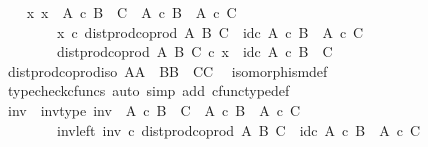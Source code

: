 \begin{isabellebody}
\ \ \isamarkupfalse%
\ {\isachardoublequoteopen}{\isasymexists}x{\isachardot}{\kern0pt}\ x\ {\isacharcolon}{\kern0pt}\ A\ {\isasymtimes}\isactrlsub c\ B\ {\isasymCoprod}\ C\ {\isasymrightarrow}\ {\isacharparenleft}{\kern0pt}A\ {\isasymtimes}\isactrlsub c\ B{\isacharparenright}{\kern0pt}\ {\isasymCoprod}\ A\ {\isasymtimes}\isactrlsub c\ C\ {\isasymand}\isanewline
\ \ \ \ \ \ \ \ x\ {\isasymcirc}\isactrlsub c\ dist{\isacharunderscore}{\kern0pt}prod{\isacharunderscore}{\kern0pt}coprod\ A\ B\ C\ {\isacharequal}{\kern0pt}\ id\isactrlsub c\ {\isacharparenleft}{\kern0pt}{\isacharparenleft}{\kern0pt}A\ {\isasymtimes}\isactrlsub c\ B{\isacharparenright}{\kern0pt}\ {\isasymCoprod}\ A\ {\isasymtimes}\isactrlsub c\ C{\isacharparenright}{\kern0pt}\ {\isasymand}\isanewline
\ \ \ \ \ \ \ \ dist{\isacharunderscore}{\kern0pt}prod{\isacharunderscore}{\kern0pt}coprod\ A\ B\ C\ {\isasymcirc}\isactrlsub c\ x\ {\isacharequal}{\kern0pt}\ id\isactrlsub c\ {\isacharparenleft}{\kern0pt}A\ {\isasymtimes}\isactrlsub c\ B\ {\isasymCoprod}\ C{\isacharparenright}{\kern0pt}{\isachardoublequoteclose}\isanewline
\ \ \ \ \isamarkupfalse%
\ dist{\isacharunderscore}{\kern0pt}prod{\isacharunderscore}{\kern0pt}coprod{\isacharunderscore}{\kern0pt}iso{\isacharbrackleft}{\kern0pt}\ A{\isacharequal}{\kern0pt}A{\isacharcomma}{\kern0pt}\ \ B{\isacharequal}{\kern0pt}B{\isacharcomma}{\kern0pt}\ \ C{\isacharequal}{\kern0pt}C{\isacharbrackright}{\kern0pt}\ \isamarkupfalse%
\ isomorphism{\isacharunderscore}{\kern0pt}def\isanewline
\ \ \ \ \isamarkupfalse%
\ {\isacharparenleft}{\kern0pt}typecheck{\isacharunderscore}{\kern0pt}cfuncs{\isacharcomma}{\kern0pt}\ auto\ simp\ add{\isacharcolon}{\kern0pt}\ cfunc{\isacharunderscore}{\kern0pt}type{\isacharunderscore}{\kern0pt}def{\isacharparenright}{\kern0pt}\isanewline
\ \ \isamarkupfalse%
\ \isamarkupfalse%
\ inv\ \ inv{\isacharunderscore}{\kern0pt}type{\isacharcolon}{\kern0pt}\ {\isachardoublequoteopen}inv\ {\isacharcolon}{\kern0pt}\ A\ {\isasymtimes}\isactrlsub c\ B\ {\isasymCoprod}\ C\ {\isasymrightarrow}\ {\isacharparenleft}{\kern0pt}A\ {\isasymtimes}\isactrlsub c\ B{\isacharparenright}{\kern0pt}\ {\isasymCoprod}\ A\ {\isasymtimes}\isactrlsub c\ C{\isachardoublequoteclose}\ \isanewline
\ \ \ \ \ \ \ \ inv{\isacharunderscore}{\kern0pt}left{\isacharcolon}{\kern0pt}\ {\isachardoublequoteopen}inv\ {\isasymcirc}\isactrlsub c\ dist{\isacharunderscore}{\kern0pt}prod{\isacharunderscore}{\kern0pt}coprod\ A\ B\ C\ {\isacharequal}{\kern0pt}\ id\isactrlsub c\ {\isacharparenleft}{\kern0pt}{\isacharparenleft}{\kern0pt}A\ {\isasymtimes}\isactrlsub c\ B{\isacharparenright}{\kern0pt}\ {\isasymCoprod}\ A\ {\isasymtimes}\isactrlsub c\ C{\isacharparenright}{\kern0pt}{\isachardoublequoteclose}\ \isanewline

\end{isabellebody}
